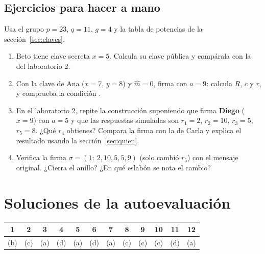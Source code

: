 \documentclass[11pt,a4paper]{article}
\theoremstyle{definition}
\theoremstyle{plain}
\theoremstyle{remark}
\newcommand{\mh}{\hat{m}}
\begin{document}
\subsection*{Ejercicios para hacer a mano}

Usa el grupo $p = 23$, $q = 11$, $g = 4$ y la tabla de potencias de la
sección~\ref{sec:claves}.

\begin{enumerate}[leftmargin=2.4em,itemsep=0.5em]
  \item Beto tiene clave secreta $x = 5$. Calcula su clave pública y compárala con la
    del laboratorio 2.
  \item Con la clave de Ana ($x = 7$, $y = 8$) y $\mh = 0$, firma con $a = 9$: calcula
    $R$, $c$ y $r$, y comprueba la condición .
  \item En el laboratorio 2, repite la construcción suponiendo que firma
    \textbf{Diego} ($x = 9$) con $a = 5$ y que las respuestas simuladas son
    $r_1 = 2$, $r_2 = 10$, $r_3 = 5$, $r_5 = 8$. ¿Qué $r_4$ obtienes? Compara la firma
    con la de Carla y explica el resultado usando la sección~\ref{sec:quien}.
  \item Verifica la firma $\sigma = (1;\ 2, 10, 5, 5, 9)$ (solo cambió $r_5$) con el
    mensaje original. ¿Cierra el anillo? ¿En qué eslabón se nota el cambio?
\end{enumerate}

\clearpage
\appendix
\section{Soluciones de la autoevaluación}\label{app:soluciones}

\begin{center}\small
\captionsetup{type=table}
\caption{Respuestas correctas.}
\begin{tabular}{@{}*{12}{c}@{}}
\toprule
1 & 2 & 3 & 4 & 5 & 6 & 7 & 8 & 9 & 10 & 11 & 12 \\
\midrule
(b) & (c) & (a) & (d) & (a) & (d) & (a) & (c) & (c) & (c) & (d) & (a) \\
\bottomrule
\end{tabular}
\end{center}
\end{document}
